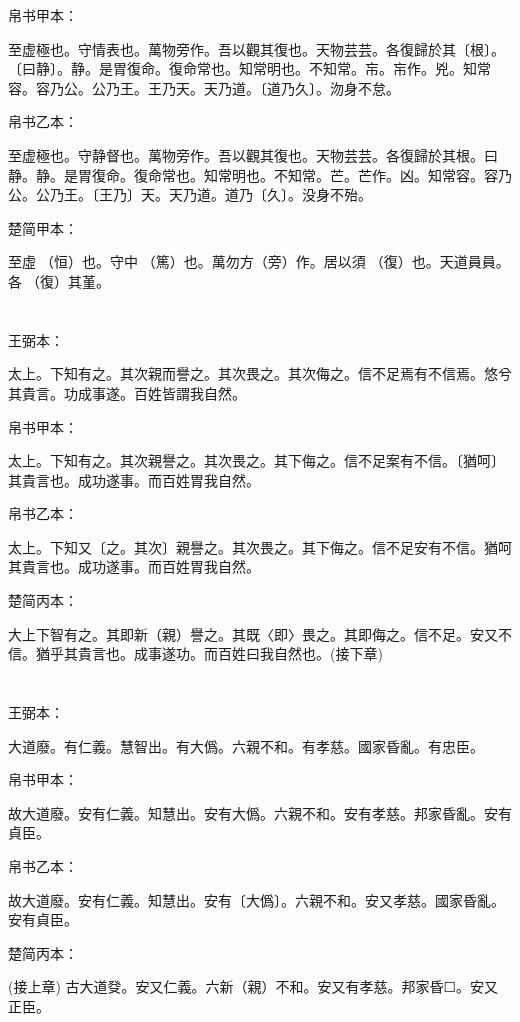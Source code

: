 \documentclass[a5paper]{ctexbook}
\begin{document}
    
    帛书甲本：

    至虚極也。守情表也。萬物旁作。吾以觀其復也。天物芸芸。各復歸於其〔根〕。〔曰静〕。静。是胃復命。復命常也。知常明也。不知常。㠵。㠵作。兇。知常容。容乃公。公乃王。王乃天。天乃道。〔道乃久〕。沕身不怠。

    帛书乙本：

    至虚極也。守静督也。萬物旁作。吾以觀其復也。天物芸芸。各復歸於其根。曰静。静。是胃復命。復命常也。知常明也。不知常。芒。芒作。凶。知常容。容乃公。公乃王。〔王乃〕天。天乃道。道乃〔久〕。没身不殆。

    楚简甲本：

    至虛𠄨（恒）也。守中󶴮（篤）也。萬勿方（旁）作。居以須󵯿（復）也。天道員員。各󵯿（復）其堇。

    \chapter{}
    王弼本：

    太上。下知有之。其次親而譽之。其次畏之。其次侮之。信不足焉有不信焉。悠兮其貴言。功成事遂。百姓皆謂我自然。

    
    帛书甲本：

    太上。下知有之。其次親譽之。其次畏之。其下侮之。信不足案有不信。〔猶呵〕其貴言也。成功遂事。而百姓胃我自然。

    帛书乙本：

    太上。下知又〔之。其次〕親譽之。其次畏之。其下侮之。信不足安有不信。猶呵其貴言也。成功遂事。而百姓胃我自然。

    楚简丙本：

    大上下智有之。其即新（親）譽之。其既〈即〉畏之。其即侮之。信不足。安又不信。猶乎其貴言也。成事遂功。而百姓曰我自然也。(接下章)

    \chapter{}
    王弼本：

    大道廢。有仁義。慧智出。有大僞。六親不和。有孝慈。國家昏亂。有忠臣。

    
    帛书甲本：

    故大道廢。安有仁義。知慧出。安有大僞。六親不和。安有孝慈。邦家昏亂。安有貞臣。

    帛书乙本：

    故大道廢。安有仁義。知慧出。安有〔大僞〕。六親不和。安又孝慈。國家昏亂。安有貞臣。

    楚简丙本：

    (接上章) 古大道癹。安又仁義。六新（親）不和。安又有孝慈。邦家昏☐。安又正臣。
\end{document}
